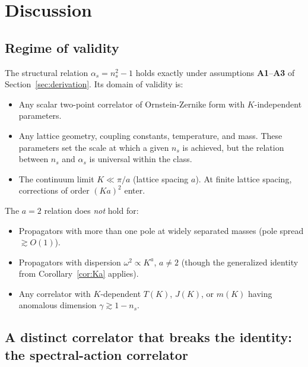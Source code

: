 \documentclass[12pt]{article}
\theoremstyle{definition}
\theoremstyle{remark}
\begin{document}
\section{Discussion}\label{sec:discussion}

\subsection{Regime of validity}

The structural relation $\alpha_s = n_s^2 - 1$ holds exactly under assumptions \textbf{A1}--\textbf{A3} of Section~\ref{sec:derivation}. Its domain of validity is:

\begin{itemize}
  \item Any scalar two-point correlator of Ornstein-Zernike form with $K$-independent parameters.
  \item Any lattice geometry, coupling constants, temperature, and mass. These parameters set the scale at which a given $n_s$ is achieved, but the relation between $n_s$ and $\alpha_s$ is universal within the class.
  \item The continuum limit $K \ll \pi/a$ (lattice spacing $a$). At finite lattice spacing, corrections of order $(Ka)^2$ enter.
\end{itemize}

The $a = 2$ relation does \emph{not} hold for:
\begin{itemize}
  \item Propagators with more than one pole at widely separated masses (pole spread $\gtrsim O(1)$).
  \item Propagators with dispersion $\omega^2 \propto K^a$, $a \neq 2$ (though the generalized identity from Corollary~\ref{cor:Ka} applies).
  \item Any correlator with $K$-dependent $T(K)$, $J(K)$, or $m(K)$ having anomalous dimension $\gamma \gtrsim 1 - n_s$.
\end{itemize}

\subsection{A distinct correlator that breaks the identity: the spectral-action correlator}
\end{document}
